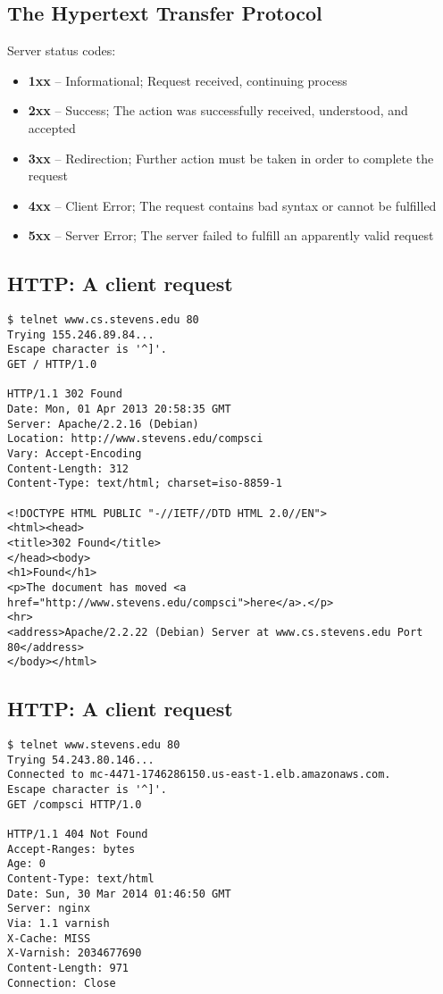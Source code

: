 \documentclass[xga]{xdvislides}
\begin{document}
\subsection{The Hypertext Transfer Protocol}
Server status codes:
\begin{itemize}
	\item {\bf 1xx} -- Informational; Request received, continuing process
	\item {\bf 2xx} -- Success; The action was successfully received,
        understood, and accepted
	\item {\bf 3xx} -- Redirection; Further action must be taken in order to
        complete the request
	\item {\bf 4xx} -- Client Error; The request contains bad syntax or
		cannot be fulfilled
	\item {\bf 5xx} -- Server Error; The server failed to fulfill an
		apparently valid request
\end{itemize}

\subsection{HTTP: A client request}
\smallish
\begin{verbatim}
$ telnet www.cs.stevens.edu 80
Trying 155.246.89.84...
Escape character is '^]'.
GET / HTTP/1.0

HTTP/1.1 302 Found
Date: Mon, 01 Apr 2013 20:58:35 GMT
Server: Apache/2.2.16 (Debian)
Location: http://www.stevens.edu/compsci
Vary: Accept-Encoding
Content-Length: 312
Content-Type: text/html; charset=iso-8859-1

<!DOCTYPE HTML PUBLIC "-//IETF//DTD HTML 2.0//EN">
<html><head>
<title>302 Found</title>
</head><body>
<h1>Found</h1>
<p>The document has moved <a
href="http://www.stevens.edu/compsci">here</a>.</p>
<hr>
<address>Apache/2.2.22 (Debian) Server at www.cs.stevens.edu Port
80</address>
</body></html>
\end{verbatim}
\Normalsize

\subsection{HTTP: A client request}
\smallish
\begin{verbatim}
$ telnet www.stevens.edu 80
Trying 54.243.80.146...
Connected to mc-4471-1746286150.us-east-1.elb.amazonaws.com.
Escape character is '^]'.
GET /compsci HTTP/1.0

HTTP/1.1 404 Not Found
Accept-Ranges: bytes
Age: 0
Content-Type: text/html
Date: Sun, 30 Mar 2014 01:46:50 GMT
Server: nginx
Via: 1.1 varnish
X-Cache: MISS
X-Varnish: 2034677690
Content-Length: 971
Connection: Close
\end{verbatim}
\Normalsize
\end{document}
